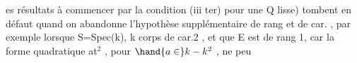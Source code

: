 \hand{(}es résultats  \hand{(}à commencer par la condition (iii ter) pour une Q
lisse)\hand{)} tombent en défaut quand on abandonne l'hypothèse supplémentaire
de rang et de car. , par exemple lorsque S=Spec(k), k corps  de car.2 , et
que E est de rang 1, car la forme quadratique at$^{2}$ , pour $\hand{a \in} k - k^{2}$ , ne peu

